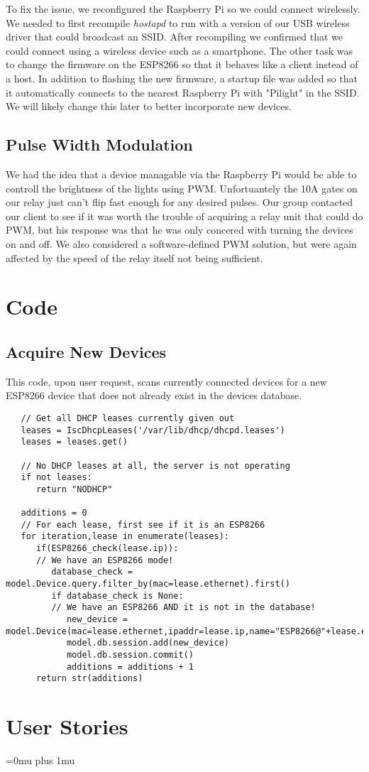 \documentclass[oneside,openright]{book}
\begin{document}
To fix the issue, we reconfigured the Raspberry Pi so we could connect wirelessly. We needed to first recompile \textit{hostapd} to run with a version of our USB wireless driver that could broadcast an SSID. After recompiling we confirmed that we could connect using a wireless device such as a smartphone. The other task was to change the firmware on the ESP8266 so that it behaves like a client instead of a host. In addition to flashing the new firmware, a startup file was added so that it automatically connects to the nearest Raspberry Pi with "Pilight" in the SSID. We will likely change this later to better incorporate new devices.

\subsection{Pulse Width Modulation}
We had the idea that a device managable via the Raspberry Pi would be able to controll the brightness of the lights using PWM. Unfortuantely the 10A gates on our relay just can't flip fast enough for any desired pulses. Our group contacted our client to see if it was worth the trouble of acquiring a relay unit that could do PWM, but his response was that he was only concered with turning the devices on and off. We also considered a software-defined PWM solution, but were again affected by the speed of the relay itself not being sufficient.
\section{Code}
\subsection{Acquire New Devices}
This code, upon user request, scans currently connected devices for a new ESP8266 device that does not already exist in the devices database.
\begin{lstlisting}
   // Get all DHCP leases currently given out
   leases = IscDhcpLeases('/var/lib/dhcp/dhcpd.leases')
   leases = leases.get()

   // No DHCP leases at all, the server is not operating
   if not leases:
      return "NODHCP"

   additions = 0
   // For each lease, first see if it is an ESP8266
   for iteration,lease in enumerate(leases):
      if(ESP8266_check(lease.ip)):
      // We have an ESP8266 mode!
         database_check = model.Device.query.filter_by(mac=lease.ethernet).first()
         if database_check is None:
         // We have an ESP8266 AND it is not in the database!
            new_device = model.Device(mac=lease.ethernet,ipaddr=lease.ip,name="ESP8266@"+lease.ethernet)
            model.db.session.add(new_device)
            model.db.session.commit()
            additions = additions + 1
      return str(additions)
   \end{lstlisting}
\section{User Stories}

\newpage
\Urlmuskip=0mu plus 1mu\relax
{}

\end{document}
